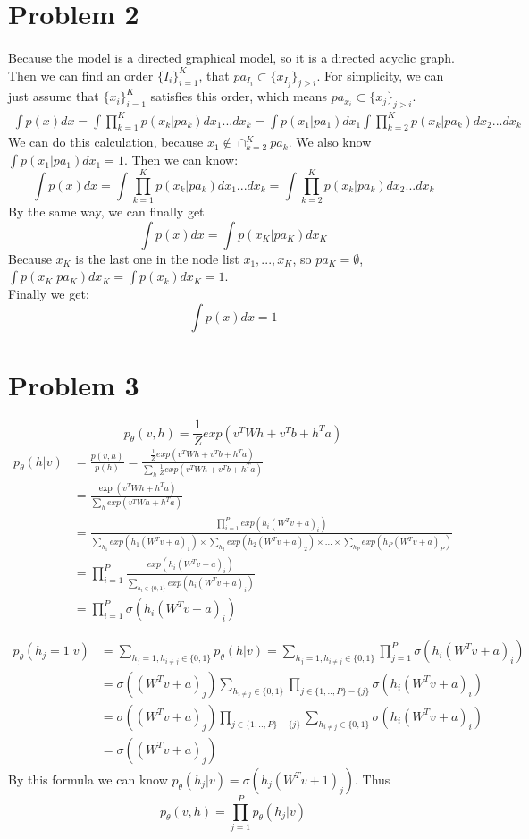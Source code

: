 \documentclass[twoside]{article}
\begin{document}
\section{Problem 2}
\paragraph{} Because the model is a directed graphical model, so it is a directed acyclic graph. 
Then we can find an order $\{I_i\}_{i=1}^{K}$, that $pa_{I_i}\subset \{x_{I_j}\}_{j>i}$. 
For simplicity, we can just assume that $\{x_i\}_{i=1}^{K}$ satisfies this order,
which means $pa_{x_i}\subset \{x_{j}\}_{j>i}$.
\begin{align*}
\int p(x) dx= \int \prod_{k=1}^K p(x_k|pa_k)dx_1...dx_k = \int p(x_1|pa_1)dx_1 \int \prod_{k=2}^K p(x_k|pa_k)dx_2...dx_k
\end{align*}
We can do this calculation, because $x_1 \not\in \cap_{k=2}^K pa_k$. We also know $\int p(x_1|pa_1)dx_1=1$. Then we can know:
$$\int p(x) dx= \int \prod_{k=1}^K p(x_k|pa_k)dx_1...dx_k=\int \prod_{k=2}^K p(x_k|pa_k)dx_2...dx_k$$
By the same way, we can finally get 
$$\int p(x) dx = \int p(x_K|pa_K) dx_K$$
Because $x_K$ is the last one in the node list $x_1,...,x_K$, so $pa_K = \emptyset$, $\int p(x_K|pa_K) dx_K = \int p(x_k)dx_K = 1$.\\
Finally we get:
$$\int p(x)dx = 1$$

\section{Problem 3}
$$p_\theta(v,h) = \frac{1}{Z}exp(v^TWh + v^Tb + h^T a)$$
\begin{align*}
p_\theta(h|v)&=\frac{p(v,h)}{p(h)} =\frac{\frac{1}{Z}exp(v^TWh + v^Tb + h^T a)}{\sum_h \frac{1}{Z}exp(v^TWh + v^Tb + h^T a) }\\
&=\frac{\exp(v^TWh + h^Ta)}{\sum_h exp(v^TWh + h^Ta) }\\
&=\frac{\prod_{i=1}^Pexp(h_i(W^Tv +a)_{i})}{\sum_{h_1} exp(h_1(W^Tv +a)_{1}) \times \sum_{h_2} exp(h_2(W^Tv +a)_{2})\times...\times\sum_{h_P} exp(h_P(W^Tv +a)_{P})}\\
&=\prod_{i=1}^P \frac{exp(h_i(W^Tv +a)_{i})}{\sum_{h_i\in\{0,1\} }exp(h_i(W^Tv +a)_{i})}\\
&=\prod_{i=1}^P \sigma (h_i(W^Tv +a)_{i})
\end{align*}

\begin{align*}
p_\theta(h_j=1|v) &= \sum_{h_j = 1, h_{i\neq j} \in \{0,1\} }p_\theta (h|v ) = \sum_{h_j = 1, h_{i\neq j} \in \{0,1\} }\prod_{j=1}^P \sigma (h_i(W^Tv +a)_{i})\\
&=\sigma((W^Tv +a)_{j})\sum_{h_{i\neq j} \in \{0,1\} }\prod_{j\in\{1,..,P\}-\{j\}}\sigma (h_i(W^Tv +a)_{i})\\
&=\sigma((W^Tv +a)_{j})\prod_{j\in\{1,..,P\}-\{j\}}\sum_{h_{i\neq j} \in \{0,1\} }\sigma (h_i(W^Tv +a)_{i})\\
&=\sigma((W^Tv +a)_{j})
\end{align*}
By this formula we can know $p_\theta(h_j|v) = \sigma(h_j(W^Tv+1)_j)$.
Thus $$p_\theta(v,h) = \prod_{j=1}^P p_\theta(h_j|v)$$
\end{document}
